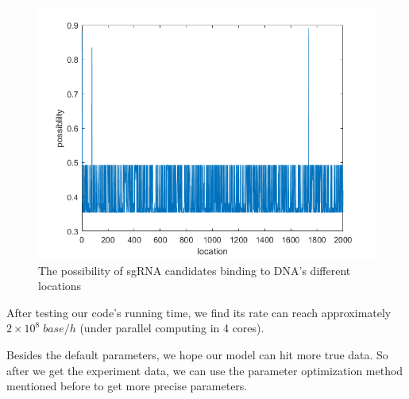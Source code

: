 \begin{figure}[H]
\centering
\includegraphics[width=0.7\linewidth]{fig1}
\caption{The possibility of sgRNA candidates binding to DNA's different locations}
\label{}
\end{figure}

After testing our code's running time, we find its rate can reach approximately $2\times10^8\;base/h$ (under parallel computing in 4 cores).

Besides the default parameters, we hope our model can hit more true data. So after we get the experiment data, we can use the parameter optimization method mentioned before to get more precise parameters. 
